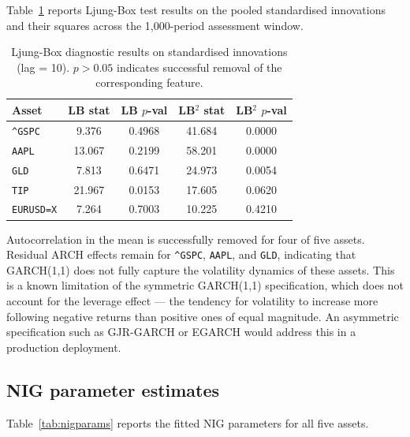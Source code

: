 \documentclass[12pt, a4paper]{article}
\begin{document}
Table~\ref{tab:ljungbox} reports Ljung-Box test results on the 
pooled standardised innovations and their squares across the 
1,000-period assessment window.

\begin{table}[H]
\centering
\caption{Ljung-Box diagnostic results on standardised innovations 
(lag = 10). $p > 0.05$ indicates successful removal of the 
corresponding feature.}
\label{tab:ljungbox}
\begin{tabular}{lcccc}
\toprule
\textbf{Asset} & \textbf{LB stat} & \textbf{LB $p$-val} 
  & \textbf{LB$^2$ stat} & \textbf{LB$^2$ $p$-val} \\
\midrule
\texttt{\^{}GSPC}   & 9.376  & 0.4968 & 41.684 & 0.0000 \\
\texttt{AAPL}       & 13.067 & 0.2199 & 58.201 & 0.0000 \\
\texttt{GLD}        & 7.813  & 0.6471 & 24.973 & 0.0054 \\
\texttt{TIP}        & 21.967 & 0.0153 & 17.605 & 0.0620 \\
\texttt{EURUSD=X}   & 7.264  & 0.7003 & 10.225 & 0.4210 \\
\bottomrule
\end{tabular}
\end{table}

Autocorrelation in the mean is successfully removed for four of 
five assets. Residual ARCH effects remain for \texttt{\^{}GSPC}, 
\texttt{AAPL}, and \texttt{GLD}, indicating that 
GARCH(1,1) does not fully capture the volatility dynamics of 
these assets. This is a known limitation of the symmetric 
GARCH(1,1) specification, which does not account for the leverage 
effect --- the tendency for volatility to increase more following 
negative returns than positive ones of equal magnitude. An 
asymmetric specification such as GJR-GARCH or EGARCH would address 
this in a production deployment.

\subsection{NIG parameter estimates}

Table~\ref{tab:nigparams} reports the fitted NIG parameters for 
all five assets.
\end{document}
